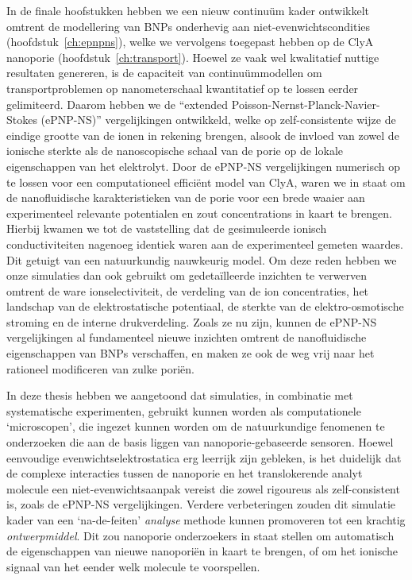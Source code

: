 In de finale hoofstukken hebben we een nieuw continu\"{u}m kader ontwikkelt omtrent de modellering van BNPs
onderhevig aan niet-evenwichtscondities (hoofdstuk~\ref{ch:epnpns}), welke we vervolgens toegepast hebben op
de ClyA nanoporie (hoofdstuk~\ref{ch:transport}). Hoewel ze vaak wel kwalitatief nuttige resultaten genereren,
is de capaciteit van continu\"{u}mmodellen om transportproblemen op nanometerschaal kwantitatief op te lossen
eerder gelimiteerd. Daarom hebben we de ``extended Poisson-Nernst-Planck-Navier-Stokes ({ePNP-NS})''
vergelijkingen ontwikkeld, welke op zelf-consistente wijze de eindige grootte van de ionen in rekening
brengen, alsook de invloed van zowel de ionische sterkte als de nanoscopische schaal van de porie op de lokale
eigenschappen van het elektrolyt. Door de {ePNP-NS} vergelijkingen numerisch op te lossen voor een
computationeel effici\"{e}nt model van ClyA, waren we in staat om de nanofluidische karakteristieken van de
porie voor een brede waaier aan experimenteel relevante potentialen en zout concentrations in kaart te
brengen. Hierbij kwamen we tot de vaststelling dat de gesimuleerde ionisch conductiviteiten nagenoeg identiek
waren aan de experimenteel gemeten waardes. Dit getuigt van een natuurkundig nauwkeurig model. Om deze reden
hebben we onze simulaties dan ook gebruikt om gedeta\"{i}lleerde inzichten te verwerven omtrent de ware
ionselectiviteit, de verdeling van de ion concentraties, het landschap van de elektrostatische potentiaal, de
sterkte van de elektro-osmotische stroming en de interne drukverdeling. Zoals ze nu zijn, kunnen de {ePNP-NS}
vergelijkingen al fundamenteel nieuwe inzichten omtrent de nanofluidische eigenschappen van BNPs verschaffen,
en maken ze ook de weg vrij naar het rationeel modificeren van zulke pori\"{e}n.

In deze thesis hebben we aangetoond dat simulaties, in combinatie met systematische experimenten, gebruikt
kunnen worden als computationele `microscopen', die ingezet kunnen worden om de natuurkundige fenomenen te
onderzoeken die aan de basis liggen van nanoporie-gebaseerde sensoren. Hoewel eenvoudige
evenwichtselektrostatica erg leerrijk zijn gebleken, is het duidelijk dat de complexe interacties tussen de
nanoporie en het translokerende analyt molecule een niet-evenwichtsaanpak vereist die zowel rigoureus als
zelf-consistent is, zoals de {ePNP-NS} vergelijkingen. Verdere verbeteringen zouden dit simulatie kader van
een `na-de-feiten' \emph{analyse} methode kunnen promoveren tot een krachtig \emph{ontwerpmiddel}. Dit zou
nanoporie onderzoekers in staat stellen om automatisch de eigenschappen van nieuwe nanopori\"{e}n in kaart te
brengen, of om het ionische signaal van het eender welk molecule te voorspellen.


\cleardoublepage

